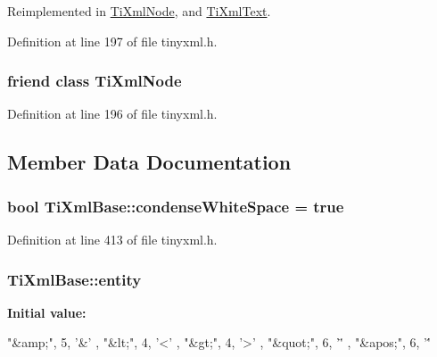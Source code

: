 Reimplemented in \hyperlink{class_ti_xml_node_ab6592e32cb9132be517cc12a70564c4b}{TiXmlNode}, and \hyperlink{class_ti_xml_text_ab6592e32cb9132be517cc12a70564c4b}{TiXmlText}.



Definition at line 197 of file tinyxml.h.

\hypertarget{class_ti_xml_base_a218872a0d985ae30e78c55adc4bdb196}{
\subsubsection[{TiXmlNode}]{\setlength{\rightskip}{0pt plus 5cm}friend class {\bf TiXmlNode}}}
\label{class_ti_xml_base_a218872a0d985ae30e78c55adc4bdb196}


Definition at line 196 of file tinyxml.h.



\subsection{Member Data Documentation}
\hypertarget{class_ti_xml_base_a447a05f6a3edbb7892f66f9df8244a3d}{
\subsubsection[{condenseWhiteSpace}]{\setlength{\rightskip}{0pt plus 5cm}bool {\bf TiXmlBase::condenseWhiteSpace} = true}}
\label{class_ti_xml_base_a447a05f6a3edbb7892f66f9df8244a3d}


Definition at line 413 of file tinyxml.h.

\hypertarget{class_ti_xml_base_aae956c75fedff20d337f7cc109c6b71a}{
\subsubsection[{entity}]{ {\bf TiXmlBase::entity}}}
\label{class_ti_xml_base_aae956c75fedff20d337f7cc109c6b71a}
{\bfseries Initial value:}
\begin{DoxyCode}
 
{
        { "&amp;",  5, '&' },
        { "&lt;",   4, '<' },
        { "&gt;",   4, '>' },
        { "&quot;", 6, '\"' },
        { "&apos;", 6, '\'' }
}
\end{DoxyCode}


